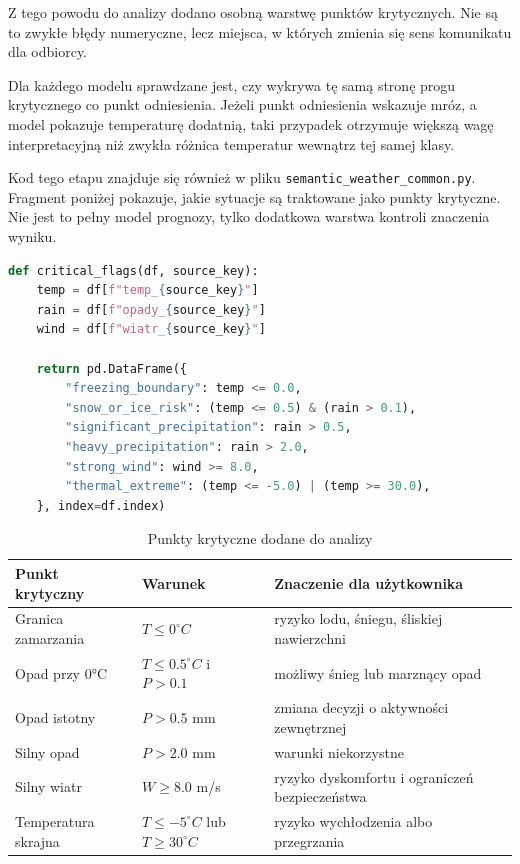 \documentclass[a4paper,12pt]{article}
\begin{document}
\noindent
Z tego powodu do analizy dodano osobną warstwę punktów krytycznych. Nie są to
zwykłe błędy numeryczne, lecz miejsca, w których zmienia się sens komunikatu
dla odbiorcy.

\noindent
Dla każdego modelu sprawdzane jest, czy wykrywa tę samą stronę progu
krytycznego co punkt odniesienia. Jeżeli punkt odniesienia wskazuje mróz, a
model pokazuje temperaturę dodatnią, taki przypadek otrzymuje większą wagę
interpretacyjną niż zwykła różnica temperatur wewnątrz tej samej klasy.

\noindent
Kod tego etapu znajduje się również w pliku
\texttt{semantic\_weather\_common.py}. Fragment poniżej pokazuje, jakie
sytuacje są traktowane jako punkty krytyczne. Nie jest to pełny model prognozy,
tylko dodatkowa warstwa kontroli znaczenia wyniku.

\begin{lstlisting}[language=Python]
def critical_flags(df, source_key):
    temp = df[f"temp_{source_key}"]
    rain = df[f"opady_{source_key}"]
    wind = df[f"wiatr_{source_key}"]

    return pd.DataFrame({
        "freezing_boundary": temp <= 0.0,
        "snow_or_ice_risk": (temp <= 0.5) & (rain > 0.1),
        "significant_precipitation": rain > 0.5,
        "heavy_precipitation": rain > 2.0,
        "strong_wind": wind >= 8.0,
        "thermal_extreme": (temp <= -5.0) | (temp >= 30.0),
    }, index=df.index)
\end{lstlisting}

\begin{table}[h]
\centering
\caption{Punkty krytyczne dodane do analizy}
\small
\renewcommand{\arraystretch}{1.15}
\begin{tabularx}{\textwidth}{p{3.0cm}p{3.7cm}X}
\toprule
Punkt krytyczny & Warunek & Znaczenie dla użytkownika \\
\midrule
Granica zamarzania & \(T \leq 0^\circ C\) & ryzyko lodu, śniegu, śliskiej nawierzchni \\
Opad przy 0°C & \(T \leq 0.5^\circ C\) i \(P > 0.1\) & możliwy śnieg lub marznący opad \\
Opad istotny & \(P > 0.5\) mm & zmiana decyzji o aktywności zewnętrznej \\
Silny opad & \(P > 2.0\) mm & warunki niekorzystne \\
Silny wiatr & \(W \geq 8.0\) m/s & ryzyko dyskomfortu i ograniczeń bezpieczeństwa \\
Temperatura skrajna & \(T \leq -5^\circ C\) lub \(T \geq 30^\circ C\) & ryzyko wychłodzenia albo przegrzania \\
\bottomrule
\end{tabularx}
\renewcommand{\arraystretch}{1.0}
\normalsize
\end{table}
\end{document}
